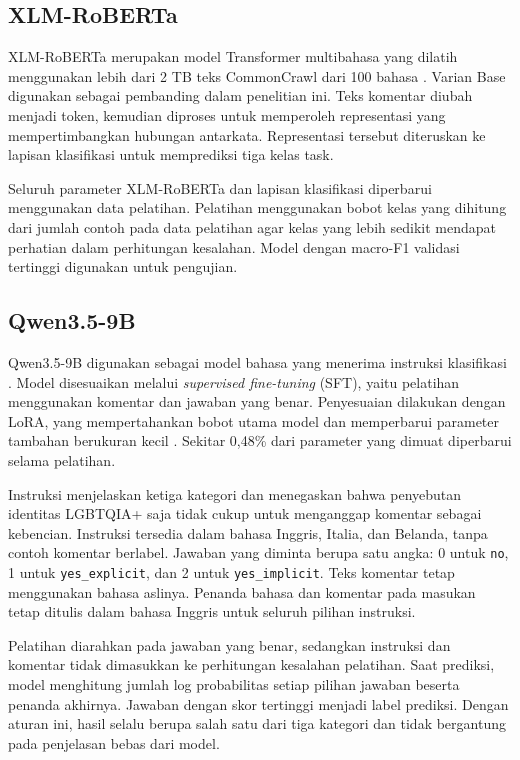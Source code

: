 \documentclass[11pt]{article}
\begin{document}
\subsection{XLM-RoBERTa}
XLM-RoBERTa merupakan model Transformer multibahasa yang dilatih menggunakan lebih dari 2 TB teks CommonCrawl dari 100 bahasa \citep{conneau-etal-2020-unsupervised}. Varian Base digunakan sebagai pembanding dalam penelitian ini. Teks komentar diubah menjadi token, kemudian diproses untuk memperoleh representasi yang mempertimbangkan hubungan antarkata. Representasi tersebut diteruskan ke lapisan klasifikasi untuk memprediksi tiga kelas task.

Seluruh parameter XLM-RoBERTa dan lapisan klasifikasi diperbarui menggunakan data pelatihan. Pelatihan menggunakan bobot kelas yang dihitung dari jumlah contoh pada data pelatihan agar kelas yang lebih sedikit mendapat perhatian dalam perhitungan kesalahan. Model dengan macro-F1 validasi tertinggi digunakan untuk pengujian.

\subsection{Qwen3.5-9B}
Qwen3.5-9B digunakan sebagai model bahasa yang menerima instruksi klasifikasi \citep{qwen-team-2026-qwen35}. Model disesuaikan melalui \textit{supervised fine-tuning} (SFT), yaitu pelatihan menggunakan komentar dan jawaban yang benar. Penyesuaian dilakukan dengan LoRA, yang mempertahankan bobot utama model dan memperbarui parameter tambahan berukuran kecil \citep{hu-etal-2021-lora}. Sekitar 0,48\% dari parameter yang dimuat diperbarui selama pelatihan.

Instruksi menjelaskan ketiga kategori dan menegaskan bahwa penyebutan identitas LGBTQIA+ saja tidak cukup untuk menganggap komentar sebagai kebencian. Instruksi tersedia dalam bahasa Inggris, Italia, dan Belanda, tanpa contoh komentar berlabel. Jawaban yang diminta berupa satu angka: 0 untuk \texttt{no}, 1 untuk \texttt{yes\_explicit}, dan 2 untuk \texttt{yes\_implicit}. Teks komentar tetap menggunakan bahasa aslinya. Penanda bahasa dan komentar pada masukan tetap ditulis dalam bahasa Inggris untuk seluruh pilihan instruksi.

Pelatihan diarahkan pada jawaban yang benar, sedangkan instruksi dan komentar tidak dimasukkan ke perhitungan kesalahan pelatihan. Saat prediksi, model menghitung jumlah log probabilitas setiap pilihan jawaban beserta penanda akhirnya. Jawaban dengan skor tertinggi menjadi label prediksi. Dengan aturan ini, hasil selalu berupa salah satu dari tiga kategori dan tidak bergantung pada penjelasan bebas dari model.
\end{document}
